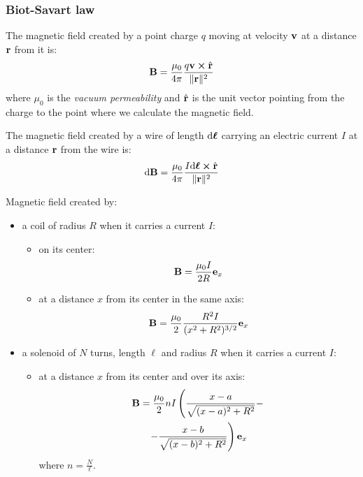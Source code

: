 \documentclass[../../../main.tex]{subfiles}
\begin{document}
\begin{multicols}{2}
    \subsubsection{Biot-Savart law}
    \begin{prop}
        The magnetic field created by a point charge $q$ moving at velocity $\boldsymbol{\mathrm{v}}$ at a distance $\boldsymbol{\mathrm{r}}$ from it is:
        $$\vf{B}=\frac{\mu_0}{4\pi}\frac{q\vf{v}\crossprod\Hat{\vf{r}}}{\|\vf{r}\|^2}$$ where $\mu_0$ is the \textit{vacuum permeability} and $\Hat{\boldsymbol{\mathrm{r}}}$ is the unit vector pointing from the charge to the point where we calculate the magnetic field.
    \end{prop}
    \begin{law}
        The magnetic field created by a wire of length $\dd\boldsymbol{\mathrm{\ell}}$ carrying an electric current $I$ at a distance $\boldsymbol{\mathrm{r}}$ from the wire is: $$\dd\vf{B}=\frac{\mu_0}{4\pi}\frac{I\dd\vf{\ell}\crossprod\hat{\vf{r}}}{\|\vf{r}\|^2}$$
    \end{law}
    \begin{prop}
        Magnetic field created by:
        \begin{itemize}
            \item a coil of radius $R$ when it carries a current $I$:
                  \begin{itemize}
                      \item on its center: $$\boldsymbol{\mathrm{B}}=\frac{\mu_0I}{2R}\boldsymbol{\mathrm{e}}_x$$
                      \item at a distance $x$ from its center in the same axis: $$\boldsymbol{\mathrm{B}}=\frac{\mu_0}{2}\frac{R^2I}{(x^2+R^2)^{3/2}}\boldsymbol{\mathrm{e}}_x$$
                  \end{itemize}
            \item a solenoid of $N$ turns, length $\ell$ and radius $R$ when it carries a current $I$:
                  \begin{itemize}
                      \item at a distance $x$ from its center and over its axis:
                            \begin{multline*} \boldsymbol{\mathrm{B}}=\frac{\mu_0}{2}nI\left(\frac{x-a}{\sqrt{(x-a)^2+R^2}}-\right.\\\left.-\frac{x-b}{\sqrt{(x-b)^2+R^2}}\right)\boldsymbol{\mathrm{e}}_x
                            \end{multline*} where $n=\frac{N}{\ell}$.
                            \begin{center}
                                \begin{minipage}{\linewidth}

\end{minipage}
\end{center}
\end{itemize}
\end{itemize}
\end{prop}
\end{multicols}
\end{document}
